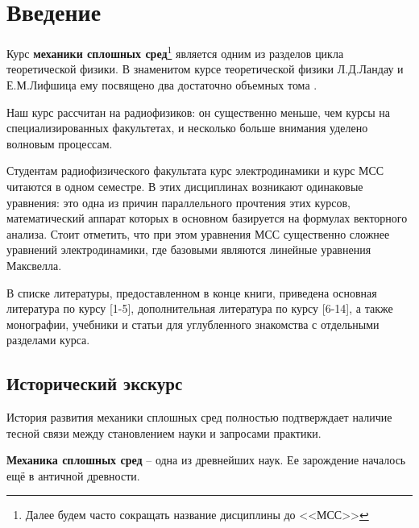 

\section{Введение}

Курс \textbf{механики сплошных сред}\footnote{Далее будем часто сокращать название дисциплины до <<МСС>>} является одним из разделов цикла теоретической физики.  В знаменитом курсе теоретической физики Л.Д.Ландау и Е.М.Лифшица  ему посвящено два достаточно объемных тома \cite{nu1}.

Наш курс рассчитан на радиофизиков: он существенно меньше, чем курсы на специализированных факультетах, и несколько больше внимания уделено волновым процессам. 

Студентам радиофизического факультата курс электродинамики и курс МСС читаются в одном семестре. В этих дисциплинах возникают одинаковые уравнения: это одна из причин параллельного прочтения этих курсов, математический аппарат которых в основном базируется на формулах векторного анализа. Стоит отметить, что при этом уравнения МСС существенно сложнее уравнений электродинамики, где базовыми являются линейные уравнения Максвелла.

В списке литературы, предоставленном в конце книги, приведена основная литература по курсу [1-5], дополнительная литература по курсу [6-14], а также монографии, учебники и статьи для углубленного знакомства с отдельными разделами курса.

\subsection{Исторический экскурс}

История развития механики сплошных сред полностью подтверждает наличие тесной связи между становлением науки и запросами практики.  

\textbf{Механика сплошных сред} -- одна из древнейших наук. Ее зарождение началось ещё в античной древности.

